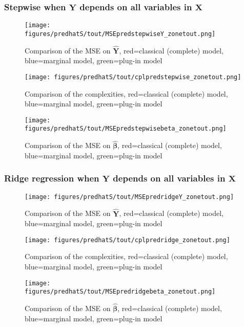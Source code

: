 \documentclass[12pt,a4paper]{report}
\begin{document}
\subsubsection{Stepwise when $\boldsymbol{Y}$ depends on all variables in $\boldsymbol{X}$}

	\begin{figure}[h!]
	\centering
		  \texttt{[image: figures/predhatS/tout/MSEpredstepwiseY\_zonetout.png]}
		\caption{Comparison of the MSE on $\hat{\boldsymbol{Y}}$, red=classical (complete) model, blue=marginal model, green=plug-in model}\label{MSEpredstepwiseY_zonetout}
	\end{figure}
	\begin{figure}[h!]
	\centering
		  \texttt{[image: figures/predhatS/tout/cplpredstepwise\_zonetout.png]}
		\caption{Comparison of the complexities, red=classical (complete) model, blue=marginal model, green=plug-in model}\label{cplpredstepwise_zonetout}
	\end{figure}
	\begin{figure}[h!]
	\centering
		  \texttt{[image: figures/predhatS/tout/MSEpredstepwisebeta\_zonetout.png]}
		\caption{Comparison of the MSE on $\hat{\boldsymbol{\beta}}$, red=classical (complete) model, blue=marginal model, green=plug-in model}\label{MSEpredstepwisebeta_zonetout}
	\end{figure}
	\FloatBarrier
\newpage
\subsubsection{Ridge regression when $\boldsymbol{Y}$ depends on all variables in $\boldsymbol{X}$}

\begin{figure}[h!]
	\centering
		  \texttt{[image: figures/predhatS/tout/MSEpredridgeY\_zonetout.png]}
		\caption{Comparison of the MSE on $\hat{\boldsymbol{Y}}$, red=classical (complete) model, blue=marginal model, green=plug-in model}\label{MSEpredridgeY_zonetout}
	\end{figure}
	\begin{figure}[h!]
	\centering
		  \texttt{[image: figures/predhatS/tout/cplpredridge\_zonetout.png]}
		\caption{Comparison of the complexities, red=classical (complete) model, blue=marginal model, green=plug-in model}\label{cplpredridge_zonetout}
	\end{figure}
	\begin{figure}[h!]
	\centering
		  \texttt{[image: figures/predhatS/tout/MSEpredridgebeta\_zonetout.png]}
		\caption{Comparison of the MSE on $\hat{\boldsymbol{\beta}}$, red=classical (complete) model, blue=marginal model, green=plug-in model}\label{MSEpredridgebeta_zonetout}
	\end{figure}
	\FloatBarrier
\end{document}
